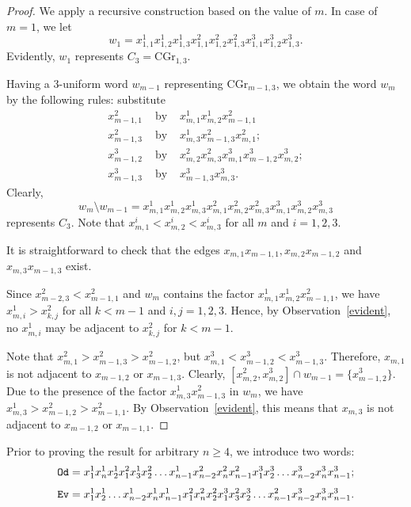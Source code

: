 \documentclass[11pt]{article}
\begin{document}
\begin{proof}
We apply a recursive construction based on the value of $m$. In case of $m=1$, we let
$$w_1=x_{1,1}^1x_{1,2}^1x_{1,3}^1x_{1,1}^2x_{1,2}^2x_{1,3}^2x_{1,1}^3x_{1,2}^3x_{1,3}^3.$$
Evidently, $w_1$ represents $C_3=\mbox{CGr}_{1,3}$.

Having a 3-uniform word $w_{m-1}$ representing $\mbox{CGr}_{m-1,3}$, we obtain the word $w_m$ by the following rules: substitute
\begin{eqnarray*}
x_{m-1,1}^2 & \mbox{ by } &x_{m,1}^1x_{m,2}^1x_{m-1,1}^2\\
x_{m-1,3}^2 & \mbox{ by } & x_{m,3}^1x_{m-1,3}^2x_{m,1}^2; \\
x_{m-1,2}^3 & \mbox{ by } &x_{m,2}^2x_{m,3}^2x_{m,1}^3x_{m-1,2}^3x_{m,2}^3;\\
x_{m-1,3}^3 & \mbox{ by } &x_{m-1,3}^3x_{m,3}^3.
\end{eqnarray*}
Clearly, 
$$w_m\setminus w_{m-1}=x_{m,1}^1x_{m,2}^1x_{m,3}^1x_{m,1}^2x_{m,2}^2x_{m,3}^2x_{m,1}^3x_{m,2}^3x_{m,3}^3$$
represents $C_3$. Note that $x_{m,1}^i<x_{m,2}^i<x_{m,3}^i$ for all $m$ and $i=1,2,3$.

It is straightforward to check that the edges $x_{m,1}x_{m-1,1}, x_{m,2}x_{m-1,2}$ and $x_{m,3}x_{m-1,3}$ exist.

Since $x_{m-2,3}^2<x_{m-1,1}^2$ and $w_m$ contains the factor $x_{m,1}^1x_{m,2}^1x_{m-1,1}^2$, we have $x_{m,i}^1>x_{k,j}^2$ for all $k<m-1$ and  $i,j=1,2,3$. Hence, by Observation~\ref{evident}, no $x_{m,i}^1$ may be adjacent to $x_{k,j}^2$ for $k<m-1$.

Note that $x_{m,1}^2 > x_{m-1,3}^2 > x_{m-1,2}^2$, but $x_{m,1}^3 < x_{m-1,2}^3 < x_{m-1,3}^3$. Therefore, $x_{m,1}$ is not adjacent to $x_{m-1,2}$ or $x_{m-1,3}$. Clearly, $[x_{m,2}^2, x_{m,2}^3] \cap w_{m-1} = \{x_{m-1,2}^3\}$. Due to the presence of the factor $x_{m,3}^1 x_{m-1,3}^2$ in $w_m$, we have $x_{m,3}^1 > x_{m-1,2}^2 > x_{m-1,1}^2$. By Observation~\ref{evident}, this means that $x_{m,3}$ is not adjacent to $x_{m-1,2}$ or $x_{m-1,1}$.
\end{proof}

Prior to proving the result for arbitrary $n \geq 4$, we introduce two words:
$$\mbox{\texttt{Od}}=x_1^1x_n^1x_2^1x_1^2x_3^1x_2^2\ldots x_{n-1}^1x_{n-2}^2x_n^2x_{n-1}^2x_1^3x_2^3\ldots x_{n-2}^3x_n^3x_{n-1}^3;$$
$$\mbox{\texttt{Ev}}=x_1^1x_2^1\ldots x_{n-2}^1x_n^1x_{n-1}^1x_1^2x_n^2x_2^2x_1^3x_3^2x_2^3\ldots x_{n-1}^2x_{n-2}^3x_n^3x_{n-1}^3.$$
\end{document}
